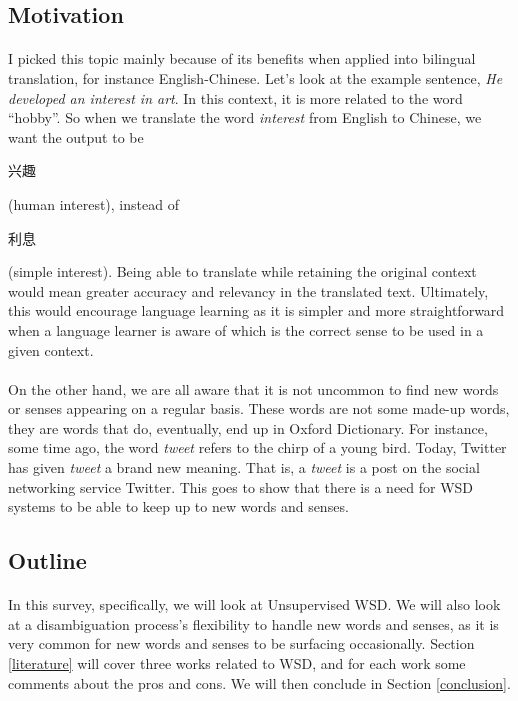 \documentclass[12 pt]{article}
\begin{document}
\subsection{Motivation}
\paragraph{}
I picked this topic mainly because of its benefits when applied into bilingual translation, for instance English-Chinese. Let's look at the example sentence, \textit{He developed an interest in art}. In this context, it is more related to the word ``hobby''. So when we translate the word \textit{interest} from English to Chinese, we want the output to be \begin{CJK}{UTF8}{gbsn}兴趣\end{CJK} (human interest), instead of \begin{CJK}{UTF8}{gbsn}利息\end{CJK} (simple interest). Being able to translate while retaining the original context would mean greater accuracy and relevancy in the translated text. Ultimately, this would encourage language learning as it is simpler and more straightforward when a language learner is aware of which is the correct sense to be used in a given context.

\paragraph{}
On the other hand, we are all aware that it is not uncommon to find new words or senses appearing on a regular basis. These words are not some made-up words, they are words that do, eventually, end up in Oxford Dictionary. For instance, some time ago, the word \textit{tweet} refers to the chirp of a young bird. Today, Twitter has given \textit{tweet} a brand new meaning. That is, a \textit{tweet} is a post on the social networking service Twitter. This goes to show that there is a need for WSD systems to be able to keep up to new words and senses.

\subsection{Outline}
\paragraph{}
In this survey, specifically, we will look at Unsupervised WSD. We will also look at a disambiguation process's flexibility to handle new words and senses, as it is very common for new words and senses to be surfacing occasionally. Section \ref{literature} will cover three works related to WSD, and for each work some comments about the pros and cons. We will then conclude in Section \ref{conclusion}.
\end{document}
